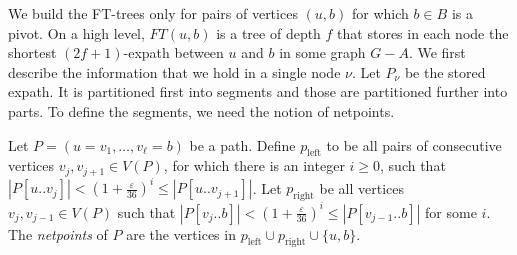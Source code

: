\documentclass{theoretics}
\newcommand*{\length}[1]{|#1|}
\renewcommand{\le}{\leqslant}
\renewcommand{\ge}{\geqslant}
\newcommand{\eps}{\varepsilon}
\begin{document}
We build the FT-trees only for pairs of vertices $(u,b)$ for which $b \in B$ is a pivot.
On a high level, $FT(u,b)$ is a tree of depth $f$ 
that stores in each node the shortest $(2f{+}1)$-expath between $u$ and $b$ in some graph $G{-}A$.
We first describe the information that we hold in a single node $\nu$.
Let $P_\nu$ be the stored expath.
It is partitioned first into segments and those are partitioned further into parts.
To define the segments, we need the notion of netpoints.

\begin{definition}
\label{def:sparse_netpoints}
  Let $P = (u=v_1, \dots, v_\ell = b)$ be a path.
  Define $p_{\text{left}}$ to be all pairs of consecutive vertices $v_j,v_{j+1} \in V(P)$,
  for which there is an integer $i \ge 0$, 
  such that $\length{P[u..v_j]} < (1+ \tfrac{\eps}{36})^i \le \length{P[u..v_{j+1}]}$.
  Let $p_{\text{right}}$ be all vertices $v_j,v_{j-1} \in V(P)$ 
  such that $\length{P[v_j..b]} < (1+ \tfrac{\eps}{36})^i \le \length{P[v_{j-1}..b]}$
  for some $i$.
  The \emph{netpoints} of $P$ are the vertices in 
  $p_{\text{left}} \cup p_{\text{right}} \cup \{u,b\}$.
\end{definition}
\end{document}
